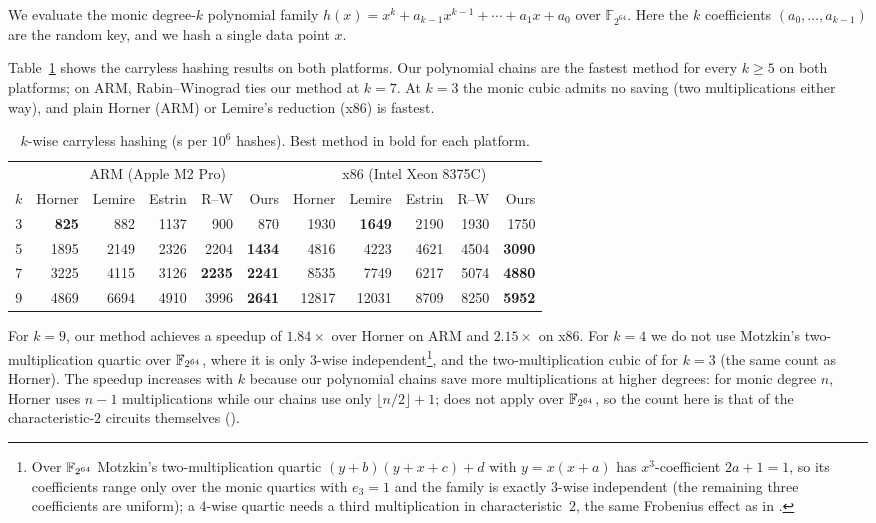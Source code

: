 We evaluate the monic degree-$k$ polynomial family $h(x) = x^k + a_{k-1}x^{k-1} + \cdots + a_1 x + a_0$ over $\mathbb{F}_{2^{64}}$.
Here the $k$ coefficients $(a_0, \ldots, a_{k-1})$ are the random key, and we hash a single data point $x$.

Table~\ref{tab:kwise_both} shows the carryless hashing results on both platforms.
Our polynomial chains are the fastest method for every $k\ge5$ on both platforms; on ARM, Rabin--Winograd ties our method at $k=7$.
At $k=3$ the monic cubic admits no saving (two multiplications either way), and plain Horner (ARM) or Lemire's reduction (x86) is fastest.

\begin{table}[!htbp]
\centering
\caption{$k$-wise carryless hashing (\textmu s per $10^6$ hashes).
         Best method in bold for each platform.}
\label{tab:kwise_both}
\small
\begin{tabular}{c|rrrrr|rrrrr}
    & \multicolumn{5}{c|}{ARM (Apple M2 Pro)} & \multicolumn{5}{c}{x86 (Intel Xeon 8375C)} \\
    $k$ & Horner & Lemire & Estrin & R--W & Ours & Horner & Lemire & Estrin & R--W & Ours \\
    \hline
    3 & \textbf{825} & 882 & 1137 & 900 & 870 & 1930 & \textbf{1649} & 2190 & 1930 & 1750 \\
    5 & 1895 & 2149 & 2326 & 2204 & \textbf{1434} & 4816 & 4223 & 4621 & 4504 & \textbf{3090} \\
    7 & 3225 & 4115 & 3126 & \textbf{2235} & \textbf{2241} & 8535 & 7749 & 6217 & 5074 & \textbf{4880} \\
    9 & 4869 & 6694 & 4910 & 3996 & \textbf{2641} & 12817 & 12031 & 8709 & 8250 & \textbf{5952} \\
\end{tabular}
\end{table}
For $k = 9$, our method achieves a speedup of $1.84\times$ over Horner on ARM and $2.15\times$ on x86.
For $k=4$ we do not use Motzkin's two-multiplication quartic over $\mathbb{F}_{2^{64}}$, where it is only $3$-wise independent\footnote{Over $\mathbb{F}_{2^{64}}$ Motzkin's two-multiplication quartic $(y+b)(y+x+c)+d$ with $y=x(x+a)$ has $x^3$-coefficient $2a+1=1$, so its coefficients range only over the monic quartics with $e_3=1$ and the family is exactly $3$-wise independent (the remaining three coefficients are uniform); a $4$-wise quartic needs a third multiplication in characteristic~$2$, the same Frobenius effect as in .}, and the two-multiplication cubic of  for $k=3$ (the same count as Horner).
The speedup increases with $k$ because our polynomial chains save more multiplications
at higher degrees: for monic degree $n$, Horner uses $n-1$ multiplications while our
chains use only $\lfloor n/2\rfloor+1$;  does not apply over
$\mathbb{F}_{2^{64}}$, so the count here is that of the characteristic-$2$ circuits
themselves ().


